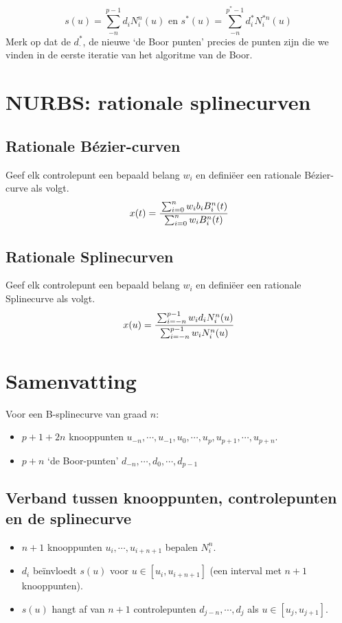\documentclass[computergesteund_ontwerp_van_curven_en_oppervlakken.tex]{subfiles}
\begin{document}
\[
s(u) = \sum_{-n}^{p-1}d_iN_{i}^{n}(u) \text{ en } s^{*}(u) = \sum_{-n}^{p^{*}-1}d^{*}_iN_{i}^{*n}(u) 
\]
Merk op dat de $d_{\cdot}^{*}$, de nieuwe `de Boor punten' precies de punten zijn die we vinden in de eerste iteratie van het algoritme van de Boor.

\section{NURBS: rationale splinecurven}
\subsection{Rationale B\'ezier-curven}
Geef elk controlepunt een bepaald belang $w_i$ en defini\"eer een rationale B\'ezier-curve als volgt.
\begin{equation}
x(t) = \cfrac{\sum_{i=0}^{n}w_ib_iB_{i}^{n}(t)}{\sum_{i=0}^{n}w_iB_{i}^{n}(t)}
\end{equation}

\subsection{Rationale Splinecurven}
Geef elk controlepunt een bepaald belang $w_i$ en defini\"eer een rationale Splinecurve als volgt.
\[
x(u) = \cfrac{\sum_{i=-n}^{p-1}w_id_iN_{i}^{n}(u)}{\sum_{i=-n}^{p-1}w_iN_{i}^{n}(u)}
\]

\section{Samenvatting}
Voor een B-splinecurve van graad $n$:
\begin{itemize}
\item $p+1+2n$ knooppunten $u_{-n},\cdots,u_{-1},u_{0},\cdots,u_{p},u_{p+1},\cdots,u_{p+n}$.
\item $p+n$ `de Boor-punten' $d_{-n},\cdots,d_{0},\cdots,d_{p-1}$
\end{itemize}

\subsection{Verband tussen knooppunten, controlepunten en de splinecurve}
\begin{itemize}
\item $n+1$ knooppunten $u_{i},\cdots,u_{i+n+1}$ bepalen $N_{i}^{n}$.
\item $d_i$ be\"invloedt $s(u)$ voor $u\in [u_i,u_{i+n+1}]$ (een interval met $n+1$ knooppunten).
\item $s(u)$ hangt af van $n+1$ controlepunten $d_{j-n},\cdots,d_{j}$ als $u\in [u_{j},u_{j+1}]$.
\end{itemize}
\end{document}
